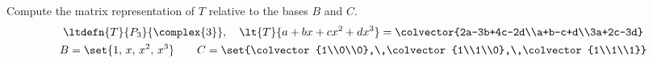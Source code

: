 Compute the matrix representation of $T$ relative to the bases $B$ and $C$.
%
\begin{gather*}
\ltdefn{T}{P_3}{\complex{3}},\quad \lt{T}{a+bx+cx^2+dx^3}=
\colvector{2a-3b+4c-2d\\a+b-c+d\\3a+2c-3d}\\
B=\set{1,\,x,\,x^2,\,x^3}\quad\quad
C=\set{\colvector{1\\0\\0},\,\colvector{1\\1\\0},\,\colvector{1\\1\\1}}
\end{gather*}